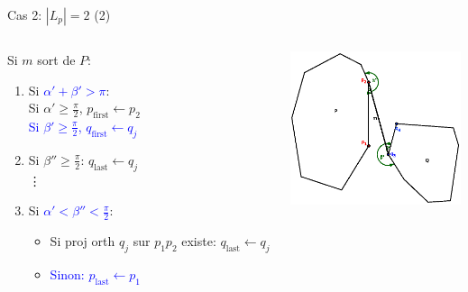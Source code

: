 \documentclass{beamer}
\begin{document}
\begin{frame}{Cas 2: $|L_p| = 2$ (2)}
	\begin{columns}[c]
	\begin{column}[T]{.5\textwidth}
		Si $m$ sort de $P$:
		\begin{enumerate}
		\item Si \textcolor{blue}{$\alpha' + \beta' > \pi$}: \\
			\hspace{0.3cm} Si $\alpha' \geq \frac{\pi}{2}$, $p_{\text{first}} \leftarrow p_{2}$\\
			\hspace{0.3cm} \textcolor{blue}{Si $\beta' \geq \frac{\pi}{2}$, $q_{\text{first}} \leftarrow q_{j}$}
		\item Si $\beta'' \geq \frac{\pi}{2}$: $q_{\text{last}} \leftarrow q_{j}$ \\ 
			\hspace{0.5cm} \vdots
		\item Si \textcolor{blue}{$\alpha' < \beta'' < \frac{\pi}{2}$}:
			\begin{itemize}
			\item Si proj orth $q_{j}$ sur $p_{1}p_{2}$ existe: $q_{\text{last}} \leftarrow q_{j}$
			\item \textcolor{blue}{Sinon: $p_{\text{last}} \leftarrow p_{\text{1}}$}
			\end{itemize}
		\end{enumerate}
	\end{column}
	\begin{column}[T]{.5\textwidth}
		\includegraphics[width=5cm]{dmin2_6.eps}
	\end{column}
	\end{columns}
\end{frame}
\end{document}
